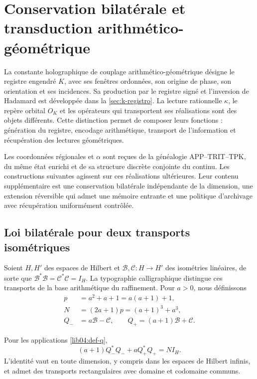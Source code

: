 \section{Conservation bilatérale et transduction arithmético-géométrique}
\label{lib04:bilateral}

La constante holographique de couplage arithmético-géométrique désigne
le registre engendré \(K\), avec ses fenêtres ordonnées, son origine de phase,
son orientation et ses incidences. Sa production par le registre signé et
l’inversion de Hadamard est développée dans la \cref{sec:k-registro}.
La lecture rationnelle \(\kappa\), le repère orbital \(O_K\) et les
opérateurs qui transportent ses réalisations sont des objets différents.
Cette distinction permet de composer leurs fonctions : génération du registre,
encodage arithmétique, transport de l’information et récupération des
lectures géométriques.

Les coordonnées régionales et \(\alpha\) sont reçues de la généalogie APP--TRIT--TPK, du même état enrichi et de sa structure discrète conjointe du continu. Les constructions suivantes agissent sur ces réalisations ultérieures. Leur contenu supplémentaire est une conservation bilatérale indépendante de la dimension, une extension réversible qui admet une mémoire entrante et une politique d'archivage avec récupération uniformément contrôlée.

\subsection{Loi bilatérale pour deux transports isométriques}
\label{lib04:ley}

Soient \(H,H'\) des espaces de Hilbert et
\(\mathcal B,\mathcal C:H\to H'\) des isométries linéaires, de sorte que
\(\mathcal B^*\mathcal B=\mathcal C^*\mathcal C=I_H\).
La typographie calligraphique distingue ces transports de la base
arithmétique du raffinement. Pour \(a>0\), nous définissons
\begin{equation}
 \begin{aligned}
 p&=a^2+a+1=a(a+1)+1,\\
 N&=(2a+1)p=(a+1)^3+a^3,\\
 Q_-&=a\mathcal B-\mathcal C,\qquad
 Q_+=(a+1)\mathcal B+\mathcal C.
 \end{aligned}
 \label{lib04:def-q}
\end{equation}

\begin{theorem}
\label{lib04:teo-balance}
Pour les applications \eqref{lib04:def-q},
\begin{equation}
 (a+1)Q_-^*Q_-+aQ_+^*Q_+=NI_H.
 \label{lib04:balance}
\end{equation}
L'identité vaut en toute dimension, y compris dans les espaces de Hilbert infinis, et admet des transports rectangulaires avec domaine et codomaine communs.
\end{theorem}

